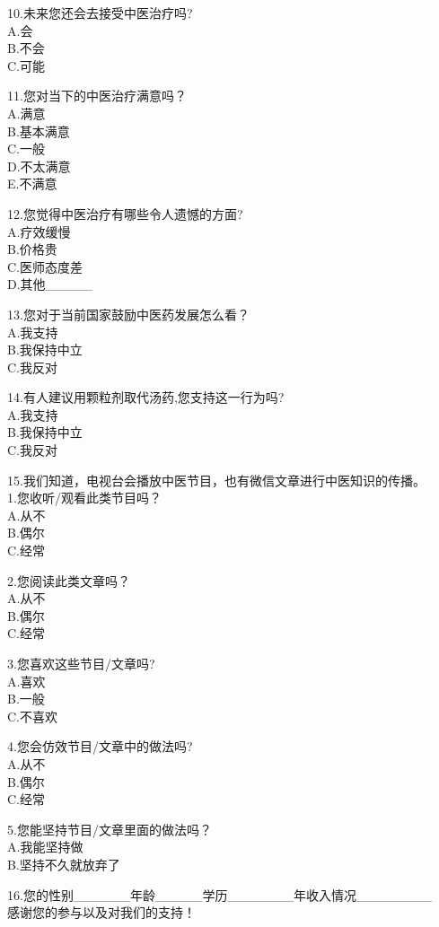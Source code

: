 \documentclass{ctexart}
\begin{document}
\begin{spacing}{1.5}
\noindent
10.未来您还会去接受中医治疗吗?\\
A.会\\
B.不会\\
C.可能

\noindent
11.您对当下的中医治疗满意吗？\\
A.满意\\
B.基本满意\\
C.一般\\
D.不太满意\\
E.不满意

\noindent
12.您觉得中医治疗有哪些令人遗憾的方面?\\
A.疗效缓慢\\
B.价格贵\\
C.医师态度差\\
D.其他_____

\noindent
13.您对于当前国家鼓励中医药发展怎么看？\\
A.我支持\\
B.我保持中立\\
C.我反对

\noindent
14.有人建议用颗粒剂取代汤药,您支持这一行为吗?\\
A.我支持\\
B.我保持中立\\
C.我反对

\noindent
15.我们知道，电视台会播放中医节目，也有微信文章进行中医知识的传播。\\
    1.您收听/观看此类节目吗？\\
    A.从不\\
    B.偶尔\\
    C.经常

\noindent
    2.您阅读此类文章吗？\\
    A.从不\\
    B.偶尔\\
    C.经常
    
    \noindent
    3.您喜欢这些节目/文章吗?\\
    A.喜欢\\
    B.一般\\
    C.不喜欢
    
    \noindent
    4.您会仿效节目/文章中的做法吗?\\
    A.从不\\
    B.偶尔\\
    C.经常
    
    \noindent
    5.您能坚持节目/文章里面的做法吗？\\
    A.我能坚持做\\
    B.坚持不久就放弃了
    
    \noindent
16.您的性别______年龄_____学历_______年收入情况________\\
\newline
感谢您的参与以及对我们的支持！
\end{spacing}
\end{document}
